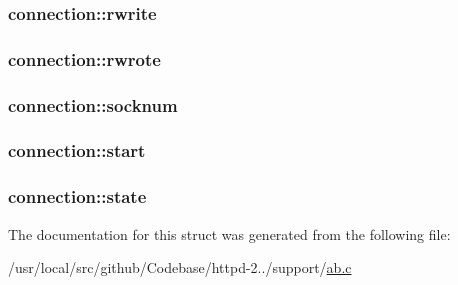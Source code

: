 \subsubsection[{\texorpdfstring{rwrite}{rwrite}}]{ connection\+::rwrite}\hypertarget{structconnection_a8f319e9aff820b6b12ce65dacf95e9b5}{}\label{structconnection_a8f319e9aff820b6b12ce65dacf95e9b5}
\subsubsection[{\texorpdfstring{rwrote}{rwrote}}]{ connection\+::rwrote}\hypertarget{structconnection_ada915c09f5f84a9f224922d40a4cfcab}{}\label{structconnection_ada915c09f5f84a9f224922d40a4cfcab}
\subsubsection[{\texorpdfstring{socknum}{socknum}}]{ connection\+::socknum}\hypertarget{structconnection_a449557ba031fa40348747a15434bcaf7}{}\label{structconnection_a449557ba031fa40348747a15434bcaf7}
\subsubsection[{\texorpdfstring{start}{start}}]{ connection\+::start}\hypertarget{structconnection_a0f47adaf841710dd3c7a15c31d3573d4}{}\label{structconnection_a0f47adaf841710dd3c7a15c31d3573d4}
\subsubsection[{\texorpdfstring{state}{state}}]{ connection\+::state}\hypertarget{structconnection_a59bc05449163ab71d729dd82fcfaa6cf}{}\label{structconnection_a59bc05449163ab71d729dd82fcfaa6cf}


The documentation for this struct was generated from the following file\+:\begin{DoxyCompactItemize}
\item 
/usr/local/src/github/\+Codebase/httpd-\/2../support/\hyperlink{ab_8c}{ab.\+c}\end{DoxyCompactItemize}
